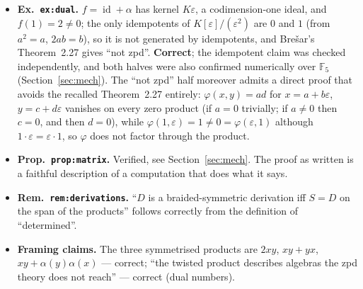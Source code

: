 \documentclass[11pt,a4paper]{article}
\newcommand{\cpt}[1]{\texttt{#1}}          %
\begin{document}
\begin{itemize}
\item \textbf{Ex.~\cpt{ex:dual}.} $f=\operatorname{id}+\alpha$ has kernel $K\varepsilon$, a codimension-one
ideal, and $f(1)=2\ne0$; the only idempotents of $K[\varepsilon]/(\varepsilon^2)$ are $0$ and $1$ (from
$a^2=a$, $2ab=b$), so it is not generated by idempotents, and Bre\v{s}ar's Theorem~2.27 gives ``not zpd''.
\textbf{Correct}; the idempotent claim was checked independently, and both halves were also confirmed
numerically over $\mathbb{F}_5$ (Section~\ref{sec:mech}). The ``not zpd'' half moreover admits a direct
proof that avoids the recalled Theorem~2.27 entirely: $\varphi(x,y)=ad$ for $x=a+b\varepsilon$,
$y=c+d\varepsilon$ vanishes on every zero product (if $a=0$ trivially; if $a\ne0$ then $c=0$, and then
$d=0$), while $\varphi(1,\varepsilon)=1\ne0=\varphi(\varepsilon,1)$ although
$1\cdot\varepsilon=\varepsilon\cdot1$, so $\varphi$ does not factor through the product.

\item \textbf{Prop.~\cpt{prop:matrix}.} Verified, see Section~\ref{sec:mech}. The proof as written is a
faithful description of a computation that does what it says.

\item \textbf{Rem.~\cpt{rem:derivations}.} ``$D$ is a braided-symmetric derivation iff $S=D$ on the span
of the products'' follows correctly from the definition of ``determined''.

\item \textbf{Framing claims.} The three symmetrised products are $2xy$, $xy+yx$,
$xy+\alpha(y)\alpha(x)$ --- correct; ``the twisted product describes algebras the zpd theory does not
reach'' --- correct (dual numbers).
\end{itemize}
\end{document}

